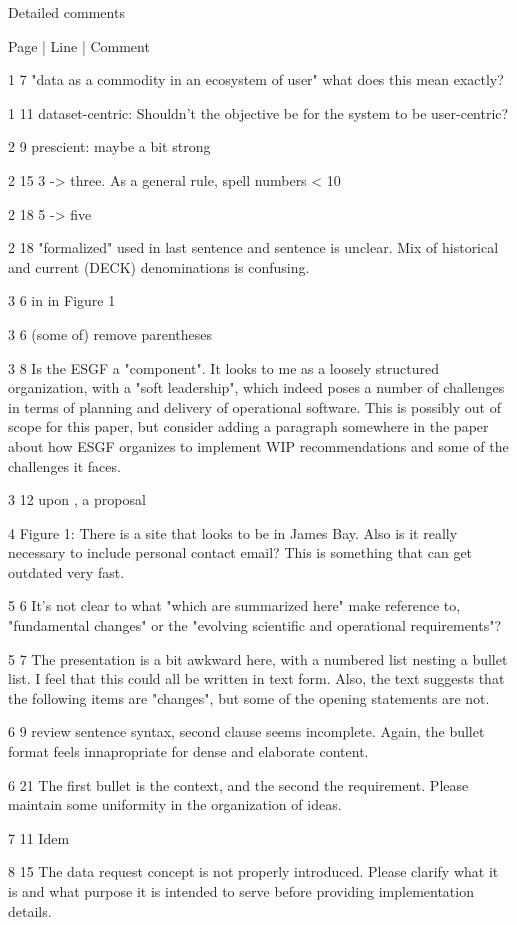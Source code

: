 \documentclass[gmd,manuscript]{copernicus}
\begin{document}
Detailed comments

Page | Line | Comment

1 7 "data as a commodity in an ecosystem of user" what does this mean
exactly?

1 11 dataset-centric: Shouldn’t the objective be for the system to be
user-centric?

2 9 prescient: maybe a bit strong

2 15 3 -> three. As a general rule, spell numbers < 10

2 18 5 -> five

2 18 "formalized" used in last sentence and sentence is unclear. Mix
of historical and current (DECK) denominations is confusing.

3 6 in in Figure 1

3 6 (some of) remove parentheses

3 8 Is the ESGF a "component". It looks to me as a loosely structured
organization, with a "soft leadership", which indeed poses a number of
challenges in terms of planning and delivery of operational software.
This is possibly out of scope for this paper, but consider adding a
paragraph somewhere in the paper about how ESGF organizes to implement
WIP recommendations and some of the challenges it faces.

3 12 upon , a proposal

4 Figure 1: There is a site that looks to be in James Bay. Also is it
really necessary to include personal contact email? This is something
that can get outdated very fast.

5 6 It’s not clear to what "which are summarized here" make reference
to, "fundamental changes" or the "evolving scientific and operational
requirements"?

5 7 The presentation is a bit awkward here, with a numbered list
nesting a bullet list. I feel that this could all be written in text
form. Also, the text suggests that the following items are "changes",
but some of the opening statements are not.

6 9 review sentence syntax, second clause seems incomplete. Again, the
bullet format feels innapropriate for dense and elaborate content.

6 21 The first bullet is the context, and the second the requirement.
Please maintain some uniformity in the organization of ideas.

7 11 Idem

8 15 The data request concept is not properly introduced. Please
clarify what it is and what purpose it is intended to serve before
providing implementation details.
\end{document}
